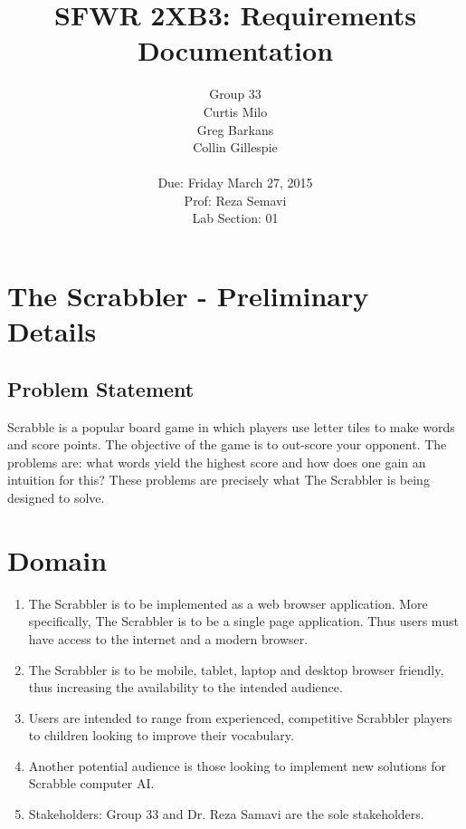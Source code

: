 \documentclass[12pt, oneside]{article}
\title{SFWR 2XB3: Requirements Documentation}
\author{Group 33 \\ 
	     Curtis Milo \\
	     Greg Barkans \\
	     Collin Gillespie \\
	     \vspace{2cm} \\
	     Due: Friday March 27, 2015 \\
	     Prof: Reza Semavi \\
	     Lab Section: 01 
	     }
\date{}
\begin{document}
\maketitle
\newpage


\section{The Scrabbler - Preliminary Details}
\subsection{Problem Statement}
Scrabble is a popular board game in which players use letter tiles to make words and score points.  The objective of the game is to out-score your opponent.  The problems are: what words yield the highest score and how does one gain an intuition for this?  These problems are precisely what The Scrabbler is being designed to solve.


\section{Domain}
\begin{enumerate}[1.]
	\item The Scrabbler is to be implemented as a web browser application.  More specifically, The 		Scrabbler is to be a single page application.  Thus users must have access to the internet 		and a modern browser.    
	\item The Scrabbler is to be mobile, tablet, laptop and desktop browser friendly, thus increasing 		the availability to the intended audience.
	\item Users are intended to range from experienced, competitive Scrabbler players to children 			looking to improve their vocabulary.
	\item Another potential audience is those looking to implement new solutions for Scrabble 			computer AI.
	\item Stakeholders: Group 33 and Dr. Reza Samavi are the sole stakeholders.  
\end{enumerate}
\end{document}

